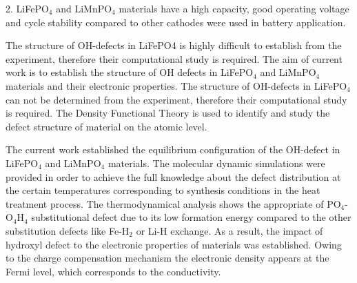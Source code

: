2. LiFePO$_4$ and LiMnPO$_4$ materials have a high capacity, good operating voltage and cycle stability compared to other cathodes were used in battery application.

The structure of OH-defects in LiFePO4 is highly difficult to establish from the experiment, therefore their computational study is required. The aim of current work is to establish the structure of OH defects in LiFePO$_4$ and LiMnPO$_4$ materials and their electronic properties. The structure of OH-defects in LiFePO$_4$ can not be determined from the experiment, therefore their computational study is required. The Density Functional Theory is used to identify and study the defect structure of material on the atomic level. 

The current work established the equilibrium configuration of the OH-defect in LiFePO$_4$ and LiMnPO$_4$ materials. The molecular dynamic simulations were provided in order to achieve the full knowledge about the defect distribution at the certain temperatures corresponding to synthesis conditions in the heat treatment process. The thermodynamical analysis shows the appropriate of PO$_4$-O$_4$H$_4$ substitutional defect due to its low formation energy compared to the other substitution defects like Fe-H$_2$ or Li-H exchange. As a result, the impact of hydroxyl defect to the electronic properties of materials was established. Owing to the charge compensation mechanism the electronic density appears at the Fermi level, which corresponds to the conductivity.